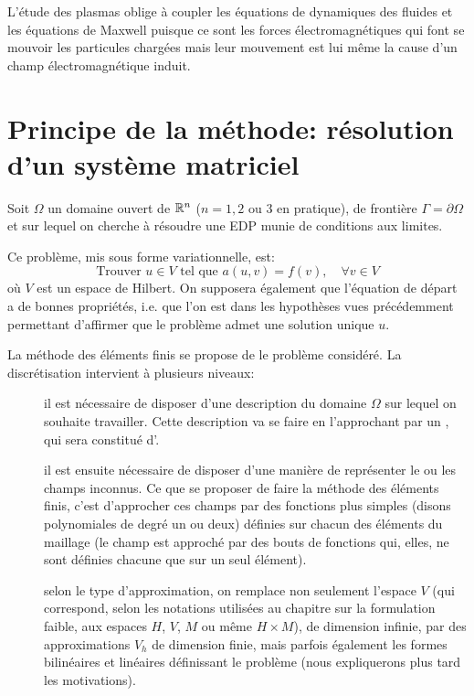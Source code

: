 L'étude des plasmas oblige à coupler les équations de dynamiques des fluides et les
équations de Maxwell puisque ce sont les forces électromagnétiques qui font se mouvoir
les particules chargées mais leur mouvement est lui même la cause d'un champ
électromagnétique induit.

\medskip
\section{Principe de la méthode: résolution d'un système matriciel}\label{Sec-mesh-carac}

Soit $\Omega$ un domaine ouvert de $\mathbb R^n$ ($n = 1, 2$ ou $3$ en pratique),
de frontière $\Gamma=\partial\Omega$ et sur lequel on cherche à résoudre une
EDP munie de conditions aux limites.

\medskip
Ce problème, mis sous forme variationnelle, est:
\begin{equation}\label{Eq-P}
\text{Trouver } u\in V \text{ tel que } a(u,v) = f(v),\quad \forall v\in V
\end{equation}
où $V$ est un espace de Hilbert.
On supposera également que l'équation de départ a de bonnes propriétés,
i.e. que l'on est dans les hypothèses vues précédemment permettant d'affirmer
que le problème admet une solution unique $u$.

\medskip
La méthode des éléments finis se propose de  le problème considéré.
La discrétisation intervient à plusieurs niveaux:
\begin{description}
  \item[]
	il est nécessaire de disposer d'une description du domaine $\Omega$ sur lequel 	on souhaite travailler. Cette description va se faire en l'approchant par 	un , qui sera constitué d'.
  \item[]
	il est ensuite nécessaire de disposer d'une manière de représenter le ou les champs inconnus. Ce que se proposer de faire la méthode des éléments finis, c'est d'approcher 	ces champs par des fonctions plus simples (disons polynomiales de degré un ou deux) définies sur chacun des éléments du maillage (le champ est approché par des bouts de fonctions qui, elles, ne sont définies chacune que sur un seul élément).
  \item[]
	selon le type d'approximation, on remplace non seulement l'espace $V$ (qui correspond, selon les notations utilisées au chapitre sur la formulation faible, aux espaces $H$, $V$, $M$ ou même $H\times M$), de dimension infinie, par des approximations $V_h$ de dimension finie, mais parfois également les formes bilinéaires et linéaires définissant le problème (nous expliquerons plus tard les motivations).
\end{description}

